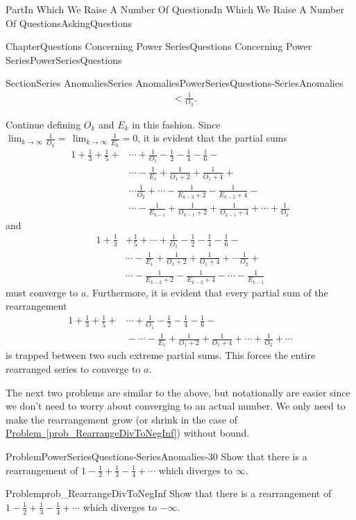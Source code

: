 \documentclass[oneside,10pt,]{book}
\newcommand{\xreffont}{\relax}
\numberwithin{equation}{part}
\newcommand{\lt}{<}
\newcommand{\amp}{&}
\begin{document}
\begin{partptx}{Part}{In Which We Raise A Number Of Questions}{}{In Which We Raise A Number Of Questions}{}{}{AskingQuestions}
\begin{chapterptx}{Chapter}{Questions Concerning Power Series}{}{Questions Concerning Power Series}{}{}{PowerSeriesQuestions}
\begin{sectionptx}{Section}{Series Anomalies}{}{Series Anomalies}{}{}{PowerSeriesQuestions-SeriesAnomalies}
\begin{align*}
\amp \lt \frac{1}{O_3}\text{.}
\end{align*}
%
\par
Continue defining \(O_k\) and \(E_k\) in this fashion. Since \(\lim_{k\rightarrow\infty}\frac{1}{O_k}=\,\lim_{k\rightarrow\infty} \frac{1}{E_k}=0\), it is evident that the partial sums%
\begin{align*}
1+\frac{1}{3} +\frac{1}{5}+\amp{}\cdots+\frac{1}{O_1}-\frac{1}{2}-\frac{1}{4}-\frac{1}{6}-\\
\amp \cdots-\frac{1}{E_1}+\frac{1}{O_1+2}+\frac{1}{O_1+4}+\\
\amp \cdots \frac{1}{O_2}+\cdots -\frac{1}{E_{k-2}+2}-\frac{1}{E_{k-2}+4}-\\
\amp \cdots-\frac{1}{E_{k-1}}+  \frac{1}{O_{k-1}+2}+\frac{1}{O_{k-1}+4}+\cdots+\frac{1}{O_k}
\end{align*}
and%
\begin{align*}
1+\frac{1}{3}\amp
+\frac{1}{5}+\cdots+\frac{1}{O_1}-\frac{1}{2}-\frac{1}{4}-
\frac{1}{6}-\\
\amp \cdots-\frac{1}{E_1}+\frac{1}{O_1+2}+\frac{1}{O_1+4}+
\cdots{} \frac{1}{O_2}+\\
\amp
\cdots-\frac{1}{E_{k-2}+2}-\frac{1}{E_{k-2}+4}-\cdots-\frac{1}{E_{k-1}}
\end{align*}
must converge to \(a\). Furthermore, it is evident that every partial sum of the rearrangement%
\begin{align*}
1+\frac{1}{3} +\frac{1}{5}+\amp\cdots+\frac{1}{O_1}-\frac{1}{2}-\frac{1}{4}- \frac{1}{6}-\\
\amp{}-\cdots-\frac{1}{E_1}+\frac{1}{O_1+2}+\frac{1}{O_1+4}+\cdots+ \frac{1}{O_2}+\cdots
\end{align*}
is trapped between two such extreme partial sums. This forces the entire rearranged series to converge to \(a\).%
\par
The next two problems are similar to the above, but notationally are easier since we don't need to worry about converging to an actual number. We only need to make the rearrangement grow (or shrink in the case of \hyperref[prob_RearrangeDivToNegInf]{Problem~{\xreffont\ref{prob_RearrangeDivToNegInf}}}) without bound.%
\begin{problem}{Problem}{}{PowerSeriesQuestions-SeriesAnomalies-30}%
Show that there is a rearrangement of \(1-\frac{1}{2}+\frac{1}{3}-\frac{1}{4}+\cdots\) which diverges to \(\infty\).%
\end{problem}
\begin{problem}{Problem}{}{prob_RearrangeDivToNegInf}%
Show that there is a rearrangement of \(1-\frac{1}{2}+\frac{1}{3}-\frac{1}{4}+\cdots\) which diverges to \(-\infty\).%

\end{problem}
\end{sectionptx}
\end{chapterptx}
\end{partptx}
\end{document}
